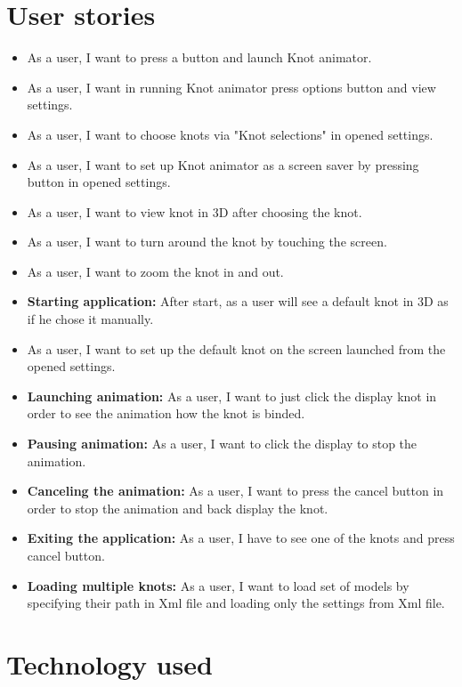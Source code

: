 \section*{User stories} %
\label{sec:User stories}
\begin{itemize}
  \item As a user, I want to press a button and launch Knot animator. 
  \item As a user, I want in running Knot animator press options button and view settings.
  \item As a user, I want to choose knots via "Knot selections" in opened settings.
  \item As a user, I want to set up Knot animator as a screen saver by pressing button in opened settings.
  \item As a user, I want to view knot in 3D after choosing the knot.
  \item As a user, I want to turn around the knot by touching the screen.
  \item As a user, I want to zoom the knot in and out.
  \item {\bf Starting application:} After start, as a user will see a default knot in 3D as if he chose it manually.
  \item As a user, I want to set up the default knot on the screen launched from the opened settings.
  \item {\bf Launching animation:}  As a user, I want to just click the display knot in order to see the animation how the knot is binded.
  \item {\bf Pausing animation:} As a user, I want to click the display to stop the animation.
  \item {\bf Canceling the animation:} As a user, I want to press the cancel button in order to stop the animation and back display the knot.
  \item {\bf Exiting the application:} As a user, I have to see one of the knots and press cancel button. 
  \item {\bf Loading multiple knots:} As a user, I want to load set of models by specifying their path in Xml file and loading only the settings from Xml file.
\end{itemize}


\section*{Technology used} %
\label{sec:Technology used}

